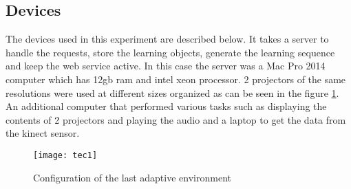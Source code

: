 \subsection{Devices}
The devices used in this experiment are described below. It takes a server to handle the requests, store the learning objects, generate the learning sequence and keep the web service active. In this case the server was a Mac Pro 2014 computer which has 12gb ram and intel xeon processor. 2 projectors of the same resolutions were used at different sizes organized as can be seen in the figure \ref{ambiente4}. An additional computer that performed various tasks such as displaying the contents of 2 projectors and playing the audio and a laptop to get the data from the kinect sensor.
\begin{figure}[ht!]  
\centering  
\texttt{[image: tec1]}
\quad  
\caption{Configuration of the last adaptive environment}  
\label{ambiente4}  
\end{figure}

